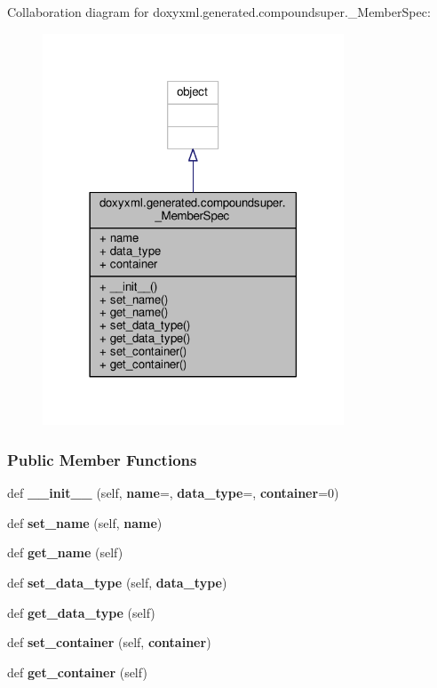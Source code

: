 Collaboration diagram for doxyxml.\+generated.\+compoundsuper.\+\_\+\+Member\+Spec\+:
\nopagebreak
\begin{figure}[H]
\begin{center}
\leavevmode
\includegraphics[width=254pt]{d0/df3/classdoxyxml_1_1generated_1_1compoundsuper_1_1__MemberSpec__coll__graph}
\end{center}
\end{figure}
\subsubsection*{Public Member Functions}
\begin{DoxyCompactItemize}
\item 
def {\bf \+\_\+\+\_\+init\+\_\+\+\_\+} (self, {\bf name}=\textquotesingle{}\textquotesingle{}, {\bf data\+\_\+type}=\textquotesingle{}\textquotesingle{}, {\bf container}=0)
\item 
def {\bf set\+\_\+name} (self, {\bf name})
\item 
def {\bf get\+\_\+name} (self)
\item 
def {\bf set\+\_\+data\+\_\+type} (self, {\bf data\+\_\+type})
\item 
def {\bf get\+\_\+data\+\_\+type} (self)
\item 
def {\bf set\+\_\+container} (self, {\bf container})
\item 
def {\bf get\+\_\+container} (self)
\end{DoxyCompactItemize}
